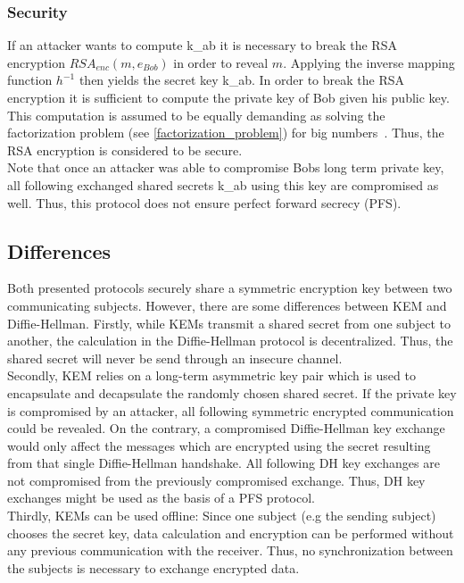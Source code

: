\subsubsection{Security}
If an attacker wants to compute \gls{k_ab} it is necessary to break the \gls{RSA} encryption $RSA_{enc}(m, e_{Bob})$ in order to reveal $m$. Applying the inverse mapping function $h^{-1}$ then yields the secret key \gls{k_ab}. In order to break the \gls{RSA} encryption it is sufficient to compute the private key of Bob given his public key. This computation is assumed to be equally demanding as solving the factorization problem (see \autoref{factorization_problem}) for big numbers~\parencite{rsa2005problem}. Thus, the RSA encryption is considered to be secure.\\
Note that once an attacker was able to compromise Bobs long term private key, all following exchanged shared secrets \gls{k_ab} using this key are compromised as well. Thus, this protocol does not ensure perfect forward secrecy (\gls{PFS}).

\subsection{Differences}
Both presented protocols securely share a symmetric encryption key between two communicating subjects. However, there are some differences between \gls{KEM} and Diffie-Hellman. Firstly, while \glspl{KEM} transmit a shared secret from one subject to another, the calculation in the Diffie-Hellman protocol is decentralized. Thus, the shared secret will never be send through an insecure channel.\\
Secondly, \gls{KEM} relies on a long-term asymmetric key pair which is used to encapsulate and decapsulate the randomly chosen shared secret. If the private key is compromised by an attacker, all following symmetric encrypted communication could be revealed. On the contrary, a compromised Diffie-Hellman key exchange would only affect the messages which are encrypted using the secret resulting from that single Diffie-Hellman handshake. All following \gls{DH} key exchanges are not compromised from the previously compromised exchange. Thus, \gls{DH} key exchanges might be used as the basis of a \gls{PFS} protocol.\\
Thirdly, KEMs can be used offline: Since one subject (e.g the sending subject) chooses the secret key, data calculation and encryption can be performed without any previous communication with the receiver. Thus, no synchronization between the subjects is necessary to exchange encrypted data.
